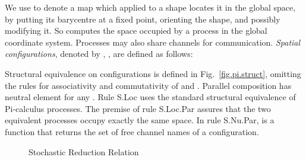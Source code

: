 \documentclass[submission,
copyright,
creativecommons
]{eptcs}
\newcommand{\these}{\vdash}
\newcommand{\parop}{\mid}
\newcommand{\rulename} [1] {{\sc #1}}
\newcommand{\dis}[2]{\texttt{dis}(#1,#2)}
\newcommand{\labRed}[1]{{\xrightarrow{#1}}}
\newcommand{\PI}{Pi}
\newcommand{\locP}[3]{\{#1\}_{#3}}
\begin{document}
We use  to denote a map which applied to a shape locates it in the global space, by putting its
barycentre at a fixed point, orienting the shape, and possibly modifying it.
So  computes the space occupied by a
  process  in the global coordinate system.\label{shape}
  Processes may also share channels
  for communication. {\em Spatial configurations}, denoted by ,
  ,  are defined as follows:\\
\centerline{
}
Structural equivalence on configurations is defined in Fig.~\ref{fig.pi.struct}, omitting the rules for associativity and commutativity of  and
. Parallel composition  has
neutral element  for any .
Rule \rulename{S.Loc} uses
the standard structural equivalence of \PI-calculus processes.
The premise
  of rule \rulename{S.Loc.Par} assures that the two equivalent
  processes occupy exactly the same space.
In rule
\rulename{S.Nu.Par},  is a function that returns the set of free channel names of a configuration.
\begin{figure}[bp]
\vspace*{-0.4cm}
\footnotesize{
    }
\vspace*{-0.6cm}
  \caption{Stochastic Reduction Relation}
\vspace*{-0.5cm}
  \label{fig:stoc.reduction}
\end{figure}
\end{document}
